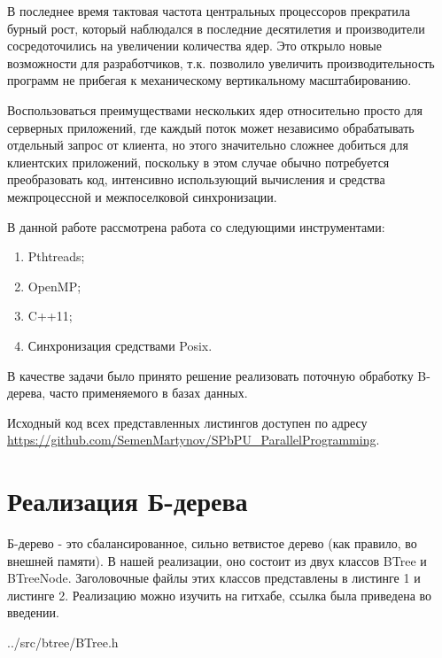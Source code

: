 \documentclass[a4paper, 12pt]{report}		%
\begin{document}
В последнее время тактовая частота центральных процессоров прекратила бурный рост, который наблюдался в последние десятилетия и производители сосредоточились на увеличении количества ядер. Это открыло новые возможности для разработчиков, т.к. позволило увеличить производительность программ не прибегая к механическому вертикальному масштабированию.
\vspace{1em}

Воспользоваться преимуществами нескольких ядер относительно просто для серверных приложений, где каждый поток может независимо обрабатывать отдельный запрос от клиента, но этого значительно сложнее добиться для клиентских приложений, поскольку в этом случае обычно потребуется преобразовать код, интенсивно использующий вычисления и средства межпроцессной и межпоселковой синхронизации.
\vspace{1em}

В данной работе рассмотрена работа со следующими инструментами:

\begin{enumerate}
    \item Pthtreads;
    \item OpenMP;
    \item C++11;
    \item Синхронизация средствами Posix.
\end{enumerate}

В качестве задачи было принято решение реализовать поточную обработку B-дерева, часто применяемого в базах данных.

\vspace{1em}
Исходный код всех представленных листингов доступен по адресу \\ \url{https://github.com/SemenMartynov/SPbPU_ParallelProgramming}.


\chapter*{Реализация Б-дерева}

Б-дерево - это сбалансированное, сильно ветвистое дерево (как правило, во внешней памяти). В нашей реализации, оно состоит из двух классов BTree и BTreeNode. Заголовочные файлы этих классов представлены в листинге 1 и листинге 2. Реализацию можно изучить на гитхабе, ссылка была приведена во введении.


{../src/btree/BTree.h}
\end{document}
